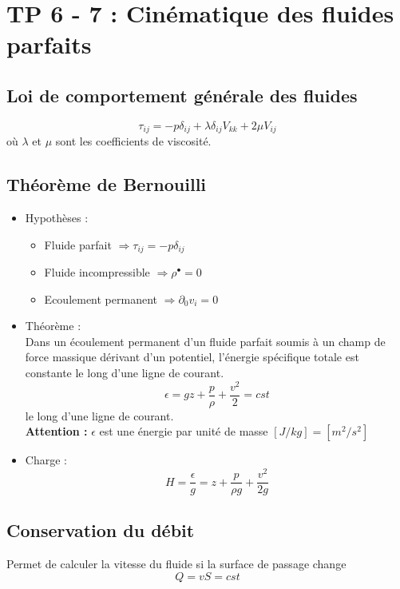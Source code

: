 
\section*{TP 6 - 7 : Cinématique des fluides parfaits}

\subsection*{Loi de comportement générale des fluides}
\begin{equation}
\tau _{ij} = -p \delta _{ij} +\lambda \delta _{ij} V_ {kk} + 2\mu V_{ij}
\end{equation}
où $\lambda$ et $\mu$ sont les coefficients de viscosité.

\subsection*{Théorème de Bernouilli}
\begin{itemize}
	\item Hypothèses :
		\begin{itemize}
			\item Fluide parfait $\Rightarrow \tau _{ij} = -p \delta _{ij}$
			\item Fluide incompressible $\Rightarrow \rho ^{\bullet} = 0$
			\item Ecoulement permanent $\Rightarrow \partial _0 v_i = 0$
		\end{itemize}
	
	\item Théorème :\\
		Dans un écoulement permanent d'un fluide parfait soumis à un champ de force massique dérivant d'un potentiel, l'énergie spécifique totale est constante le long d'une ligne de courant.
		\begin{equation}
			\epsilon = gz + \frac{p}{\rho} + \frac{v^2}{2} = cst
		\end{equation}
		le long d'une ligne de courant.\\
		\textbf{Attention :} $\epsilon$ est une énergie par unité de masse $[J/kg] = [m^2/s^2]$
		
		\item Charge :
			\begin{equation}
				H = \frac{\epsilon}{g} = z + \frac{p}{\rho g} + \frac{v^2}{2 g}
			\end{equation}
\end{itemize}

\subsection*{Conservation du débit}
Permet de calculer la vitesse du fluide si la surface de passage change 
\begin{equation}
	Q = vS = cst
\end{equation}

